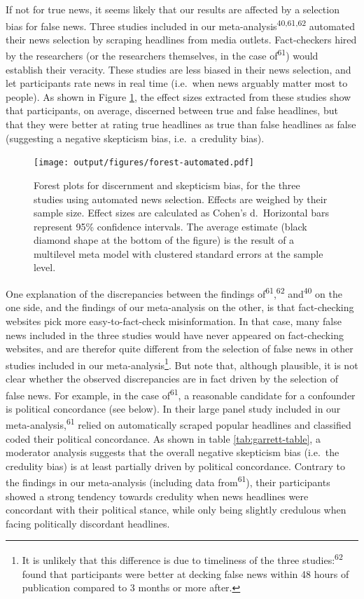 \documentclass[
  man]{apa6}
\begin{document}
If not for true news, it seems likely that our results are affected by a selection bias for false news. Three studies included in our meta-analysis\textsuperscript{40,61,62} automated their news selection by scraping headlines from media outlets. Fact-checkers hired by the researchers (or the researchers themselves, in the case of\textsuperscript{61}) would establish their veracity. These studies are less biased in their news selection, and let participants rate news in real time (i.e.~when news arguably matter most to people). As shown in Figure \ref{fig:forest-automated}, the effect sizes extracted from these studies show that participants, on average, discerned between true and false headlines, but that they were better at rating true headlines as true than false headlines as false (suggesting a negative skepticism bias, i.e.~a credulity bias).



\begin{figure}
\centering
\texttt{[image: output/figures/forest-automated.pdf]}
\caption{\label{fig:forest-automated}Forest plots for discernment and skepticism bias, for the three studies using automated news selection. Effects are weighed by their sample size. Effect sizes are calculated as Cohen's d.~Horizontal bars represent 95\% confidence intervals. The average estimate (black diamond shape at the bottom of the figure) is the result of a multilevel meta model with clustered standard errors at the sample level.}
\end{figure}

One explanation of the discrepancies between the findings of\textsuperscript{61},\textsuperscript{62} and\textsuperscript{40} on the one side, and the findings of our meta-analysis on the other, is that fact-checking websites pick more easy-to-fact-check misinformation. In that case, many false news included in the three studies would have never appeared on fact-checking websites, and are therefor quite different from the selection of false news in other studies included in our meta-analysis\footnote{It is unlikely that this difference is due to timeliness of the three studies:\textsuperscript{62} found that participants were better at decking false news within 48 hours of publication compared to 3 months or more after.}. But note that, although plausible, it is not clear whether the observed discrepancies are in fact driven by the selection of false news. For example, in the case of\textsuperscript{61}, a reasonable candidate for a confounder is political concordance (see below). In their large panel study included in our meta-analysis,\textsuperscript{61} relied on automatically scraped popular headlines and classified coded their political concordance. As shown in table \ref{tab:garrett-table}, a moderator analysis suggests that the overall negative skepticism bias (i.e.~the credulity bias) is at least partially driven by political concordance. Contrary to the findings in our meta-analysis (including data from\textsuperscript{61}), their participants showed a strong tendency towards credulity when news headlines were concordant with their political stance, while only being slightly credulous when facing politically discordant headlines.
\end{document}
